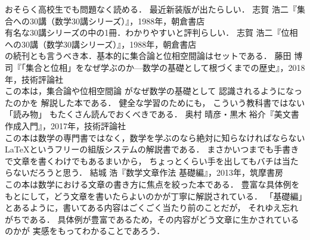 \begin{thebibliography}{99}
 おそらく高校生でも問題なく読める．
 最近新装版が出たらしい．
  志賀 浩二『集合への30講（数学30講シリーズ）』，1988年，朝倉書店 \\
 有名な30講シリーズの中の1冊．わかりやすいと評判らしい．
  志賀 浩二『位相への30講（数学30講シリーズ）』，1988年，朝倉書店 \\
 \cite{30kouset}の続刊とも言うべき本．基本的に集合論と位相空間論はセットである．
  藤田 博司『「集合と位相」をなぜ学ぶのか---数学の基礎として根づくまでの歴史』，2018年，技術評論社 \\
 この本は，集合論や位相空間論
 がなぜ数学の基礎として
 認識されるようになったのかを
 解説した本である．
 健全な学習のためにも，
 こういう教科書ではない「読み物」
 もたくさん読んでおくべきである．
   奥村 晴彦・黒木 裕介『{\LaTeXe}美文書作成入門』，2017年，技術評論社 \\
 この本は数学の専門書ではなく，数学を学ぶのなら絶対に知らなければならない
 {\LaTeX}というフリーの組版システムの解説書である．
 まさかいつまでも手書きで文章を書くわけでもあるまいから，
 ちょっとくらい手を出してもバチは当たらないだろうと思う．
  結城 浩『数学文章作法 基礎編』，2013年，筑摩書房 \\
 この本は数学における文章の書き方に焦点を絞った本である．
 豊富な具体例をもとにして，どう文章を書いたらよいのかが丁寧に解説されている．
 「基礎編」とあるように，書いてある内容はごくごく当たり前のことだが，
 それゆえ忘れがちである．
 具体例が豊富であるため，その内容がどう文章に生かされているのかが
 実感をもってわかることであろう．
\end{thebibliography}

    
